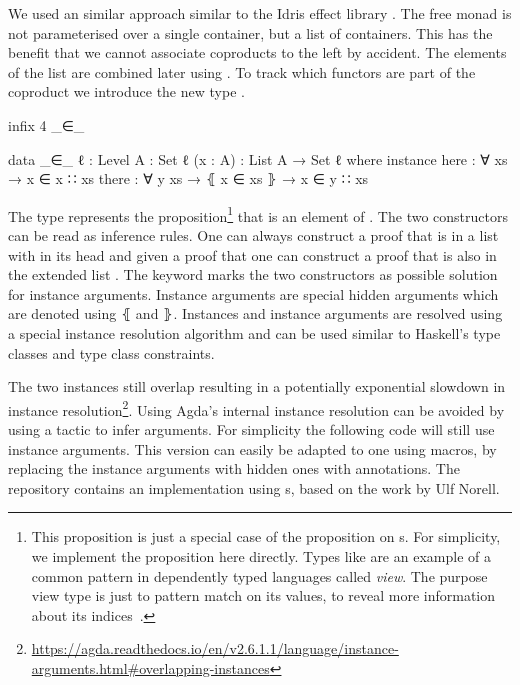 We used an similar approach similar to the Idris effect library
\cite{DBLP:conf/icfp/Brady13}.
The free monad is not parameterised over a single container, but a list
 of containers.
This has the benefit that we cannot associate coproducts to the left by
accident.
The elements of the list are combined later using .
To track which functors are part of the coproduct we introduce the new type
.

\begin{code}[hide]
infix 4 _∈_
\end{code}
\begin{code}
data _∈_ {ℓ : Level} {A : Set ℓ} (x : A) : List A → Set ℓ where
  instance
    here   : ∀ {xs} → x ∈ x ∷ xs
    there  : ∀ {y xs} → ⦃ x ∈ xs ⦄ → x ∈ y ∷ xs
\end{code}
The type
\AgdaSpace{}\AgdaSpace{}
represents the proposition\footnote{This proposition is just a special case of
  the  proposition on s.
  For simplicity, we implement the proposition here directly.
  Types like  are an example of a common pattern in
  dependently typed languages called \textit{view}.
  The purpose view type is just to pattern match on its values, to reveal more
  information about its indices~\cite{DBLP:conf/afp/Norell08}.}
that  is an element of .
The two constructors can be read as inference rules.
One can always construct a proof that  is in a list with
 in its head and given a proof that
\AgdaSpace{}\AgdaSpace{}
one can construct a proof that  is also in the extended list
\AgdaSpace{}\AgdaSpace{}.
The  keyword marks the two constructors as possible
solution for instance arguments.
Instance arguments are special hidden arguments which are denoted using
$\lBrace$ and $\rBrace$.
Instances and instance arguments are resolved using a special instance
resolution algorithm and can be used similar to Haskell's type classes
and type class constraints.

The two instances still overlap resulting in a potentially exponential slowdown
in instance resolution\footnote{\url{https://agda.readthedocs.io/en/v2.6.1.1/language/instance-arguments.html\#overlapping-instances}}.
Using Agda's internal instance resolution can be avoided by using a
tactic to infer  arguments.
For simplicity the following code will still use instance arguments.
This version can easily be adapted to one using macros, by replacing the
instance arguments with hidden ones with  annotations.
The repository contains an implementation using s, based on
the work by Ulf Norell.

